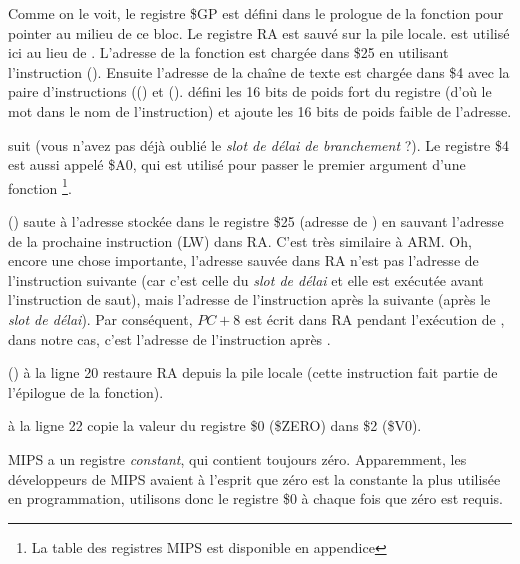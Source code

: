 

Comme on le voit, le registre \$GP est défini dans le prologue de la fonction
pour pointer au milieu de ce bloc.
Le registre \ac{RA} est sauvé sur la pile locale.
\puts est utilisé ici au lieu de \printf.
L'adresse de la fonction \puts est chargée dans \$25 en utilisant l'instruction  ().
Ensuite l'adresse de la chaîne de texte est chargée dans \$4 avec la paire
d'instructions  (() et 
().
 défini les 16 bits de poids fort du registre (d'où le mot 
dans le nom de l'instruction) et  ajoute les 16 bits de poids faible
de l'adresse.

 suit  (vous n'avez pas déjà oublié le \emph{slot de
délai de branchement} ?).
Le registre \$4 est aussi appelé \$A0, qui est utilisé pour passer le premier
argument d'une fonction \footnote{La table des registres MIPS est disponible en
appendice }.


 () saute à l'adresse stockée dans le registre
\$25 (adresse de \puts) en sauvant l'adresse de la prochaine instruction (LW)
dans \ac{RA}.
C'est très similaire à ARM.
Oh, encore une chose importante, l'adresse sauvée dans \ac{RA} n'est pas
l'adresse de l'instruction suivante (car c'est celle du \emph{slot de délai} et
elle est exécutée avant l'instruction de saut), mais l'adresse de l'instruction
après la suivante (après le \emph{slot de délai}).
Par conséquent, $PC + 8$ est écrit dans \ac{RA} pendant l'exécution de ,
dans notre cas, c'est l'adresse de l'instruction  après .

 () à la ligne 20 restaure \ac{RA} depuis la pile locale
(cette instruction fait partie de l'épilogue de la fonction).


 à la ligne 22 copie la valeur du registre \$0 (\$ZERO) dans \$2 (\$V0).
\label{MIPS_zero_register}

MIPS a un registre \emph{constant}, qui contient toujours zéro.
Apparemment, les développeurs de MIPS avaient à l'esprit que zéro est la constante
la plus utilisée en programmation, utilisons donc le registre \$0 à chaque fois
que zéro est requis.

